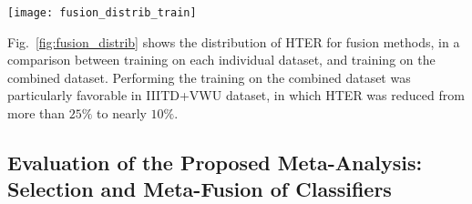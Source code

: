 

\begin{figure*}[ht]
    \centering
    \texttt{[image: fusion\_distrib\_train]}
    \caption{HTER distribution for fusion methods. On the left, training and evaluation is performed on each individual dataset. On the right, training is performed on the combined dataset, and evaluation is performed on each individual dataset.}
    \label{fig:fusion_distrib}
\end{figure*}


Fig.~\ref{fig:fusion_distrib} shows the distribution of HTER for fusion methods, in a comparison between training on each individual dataset, and training on the combined dataset. Performing the training on the combined dataset was particularly favorable in IIITD+VWU dataset, in which HTER was reduced from more than $25\%$ to nearly $10\%$. 

\subsection{Evaluation of the Proposed Meta-Analysis: Selection and Meta-Fusion of Classifiers}
\label{sec:evaluation_meta_analysis}

